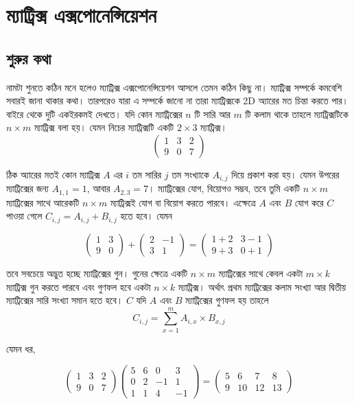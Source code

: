 \chapter{ম্যাট্রিক্স এক্সপোনেন্সিয়েশন}

\section{শুরুর কথা}

নামটা শুনতে কঠিন মনে হলেও ম্যাট্রিক্স এক্সপোনেন্সিয়েশন আসলে তেমন কঠিন কিছু না। ম্যাট্রিক্স সম্পর্কে কমবেশি সবারই জানা থাকার কথা। তারপরেও যারা এ সম্পর্কে জানো না তারা ম্যাট্রিক্সকে 2D অ্যারের মত চিন্তা করতে পার। বাইরে থেকে দুটি একইরকমই দেখতে। যদি কোন ম্যাট্রিক্সের $n$ টি সারি আর $m$ টি কলাম থাকে তাহলে ম্যাট্রিক্সটিকে $n \times m$ ম্যাট্রিক্স বলা হয়। যেমন নিচের ম্যাট্রিক্সটি একটি $2 \times 3$ ম্যাট্রিক্স।
$$
\begin{pmatrix}
1 & 3 & 2\\
9 & 0 & 7
\end{pmatrix}
$$

ঠিক অ্যারের মতই কোন ম্যাট্রিক্স $A$ এর $i$ তম সারির $j$ তম সংখ্যাকে $A_{i, j}$ দিয়ে প্রকাশ করা হয়। যেমন উপরের ম্যাট্রিক্সের জন্য $A_{1, 1} = 1$, আবার $A_{2, 3} = 7$। ম্যাট্রিক্সের যোগ, বিয়োগও সম্ভব, তবে তুমি একটি $n \times m$ ম্যাট্রিক্সের সাথে আরেকটি $n \times m$ ম্যাট্রিক্সই যোগ বা বিয়োগ করতে পারবে। এক্ষেত্রে $A$ এবং  $B$ যোগ করে $C$ পাওয়া গেলে $C_{i, j} = A_{i, j} + B_{i, j}$ হতে হবে। যেমন

$$
\begin{pmatrix}
1 & 3\\
9 & 0
\end{pmatrix}
+
\begin{pmatrix}
2 & -1\\
3 & 1
\end{pmatrix}
=
\begin{pmatrix}
1 + 2 & 3 - 1\\
9 + 3 & 0 + 1
\end{pmatrix}
$$

তবে সবচেয়ে অদ্ভুত হচ্ছে ম্যাট্রিক্সের গুন। গুনের ক্ষেত্রে একটি $n \times m$ ম্যাট্রিক্সের সাথে কেবল একটা $m \times k$ ম্যাট্রিক্স গুন করতে পারবে এবং  গুণফল হবে একটা $n \times k$ ম্যাট্রিক্স। অর্থাৎ প্রথম ম্যাট্রিক্সের কলাম সংখ্যা আর দ্বিতীয় ম্যাট্রিক্সের সারি সংখ্যা সমান হতে হবে। $C$ যদি $A$ এবং $B$ ম্যাট্রিক্সের গুণফল হয় তাহলে
$$ C_{i, j} = \sum_{x = 1}^{m} A_{i, x} \times B_{x, j}$$

যেমন ধর,

$$
\begin{pmatrix}
1 & 3 & 2\\
9 & 0 & 7
\end{pmatrix}
\begin{pmatrix}
5 & 6 & 0 & 3 \\
0 & 2 & -1 & 1\\
1 & 1 & 4 & -1
\end{pmatrix} =
\begin{pmatrix}
5 & 6 & 7 & 8\\
9 & 10 & 12 & 13
\end{pmatrix}
$$

